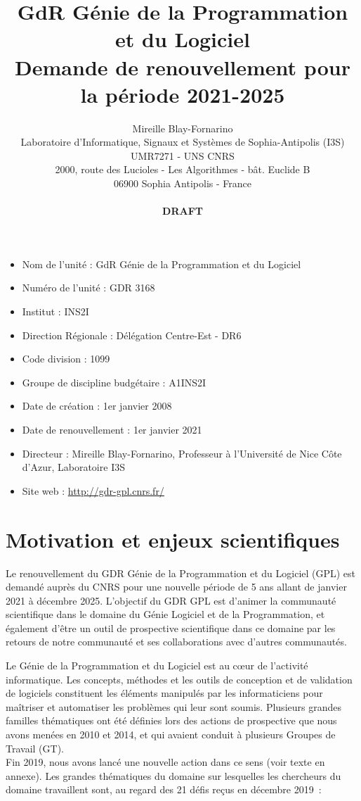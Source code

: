 \documentclass[11pt]{article}
\title{GdR Génie de la Programmation et du Logiciel\\ Demande de renouvellement pour la période 2021-2025}
\author{Mireille Blay-Fornarino\\
Laboratoire d'Informatique, Signaux et Systèmes de Sophia-Antipolis (I3S)\\ 
UMR7271 - UNS CNRS\\
2000, route des Lucioles - Les Algorithmes - bât. Euclide B\\
06900 Sophia Antipolis - France\\
\\
\textbf{DRAFT}}
\begin{document}
\maketitle



\begin{itemize}
\item Nom de l'unité : GdR Génie de la Programmation et du Logiciel
\item Numéro de l'unité : GDR 3168
\item Institut : INS2I
\item Direction Régionale : Délégation Centre-Est - DR6
\item Code division : 1099
\item Groupe de discipline budgétaire : A1INS2I
\item Date de création : 1er janvier 2008
\item Date de renouvellement : 1er janvier 2021
\item Directeur : Mireille Blay-Fornarino, Professeur à l'Université de Nice Côte d'Azur, Laboratoire I3S
\item Site web : \url{http://gdr-gpl.cnrs.fr/}
\end{itemize}

\section{Motivation et enjeux scientifiques}

Le renouvellement du GDR Génie de la Programmation et du Logiciel (GPL) est
demandé auprès du CNRS pour une nouvelle période de 5 ans allant de janvier
2021 à décembre 2025.
L'objectif du GDR GPL est d'animer la communauté scientifique dans
le domaine du Génie Logiciel et de la Programmation, et également d'être un outil de prospective scientifique dans ce domaine par les retours de notre communauté et ses collaborations avec d'autres communautés.






Le Génie de la Programmation et du Logiciel est au c{\oe}ur de l'activité
informatique. Les concepts, méthodes et les outils de conception et de
validation de logiciels constituent les éléments manipulés par les
informaticiens pour maîtriser et automatiser les problèmes qui leur sont
soumis. 
Plusieurs grandes familles thématiques ont été définies lors des actions de prospective que nous avons menées en 2010 et 2014, et qui avaient conduit à plusieurs Groupes de Travail (GT). \\
Fin 2019, nous avons lancé une nouvelle action dans ce sens (voir texte en annexe). %
Les grandes thématiques du domaine sur lesquelles les chercheurs du
domaine travaillent sont, au regard des 21 défis reçus en décembre 2019~: 
\end{document}
